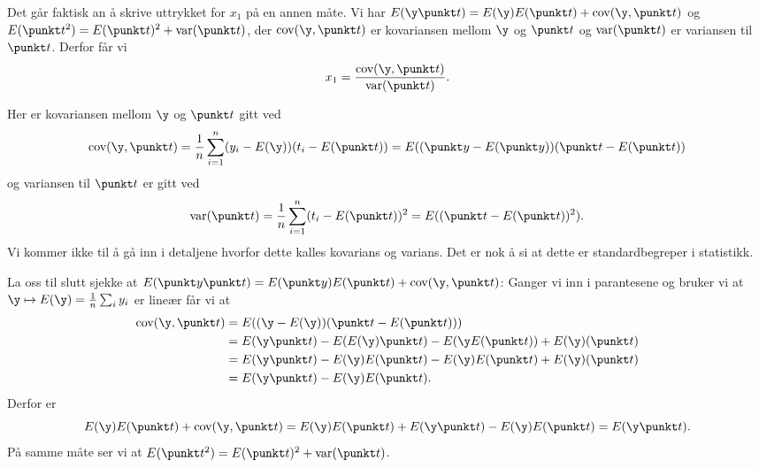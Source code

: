 Det går faktisk an å skrive uttrykket for $x_1$ på en annen måte. Vi har
$E(\y \punkt t) = E(\y)E(\punkt t) + \text{cov}(\y, \punkt t)$ og
$E(\punkt t^2) = E(\punkt t)^2 + \text{var}(\punkt t)$, der $\text{cov}(\y,
\punkt t)$ er kovariansen mellom $\y$ og $\punkt t$ og $\text{var}(\punkt t)$
er variansen til $\punkt t$. Derfor får vi
$$x_1 = \frac{\text{cov}(\y, \punkt t)}{\text{var}(\punkt t)}.$$

Her er kovariansen mellom $\y$ og $\punkt t$ gitt ved
$$\text{cov}(\y, \punkt t) = \frac{1}{n}\sum_{i=1}^n (y_i - E(\y))(t_i - E(\punkt t)) = E((\punkt y - E(\punkt y))(\punkt t - E(\punkt t))$$
og variansen til $\punkt t$ er gitt ved
$$\text{var}(\punkt t) = \frac{1}{n}\sum_{i=1}^n (t_i - E(\punkt t))^2 = E((\punkt t - E(\punkt t))^2).$$
Vi kommer ikke til å gå inn i detaljene hvorfor dette kalles kovarians og
varians. Det er nok å si at dette er standardbegreper i statistikk.

La oss til slutt sjekke at $E(\punkt y \punkt t) = E(\punkt y) E(\punkt t) + \text{cov}(\y, \punkt t)$:
Ganger vi inn i parantesene og bruker vi at $\y \mapsto E(\y) = \frac{1}{n}\sum_i y_i$ er lineær får vi at
\begin{align*}
  \text{cov}(\y, \punkt t) 
  &=
  E((\y - E(\y))(\punkt t - E(\punkt t)))\\
  &= E(\y\punkt t) - E(E(\y)\punkt t) -
  E(\y E(\punkt t)) + E(\y)( \punkt t) \\
  &= E(\y\punkt t) - E(\y)E(\punkt t) -
  E(\y ) E(\punkt t)+ E(\y)( \punkt t) \\
  &= E(\y\punkt t) - E(\y)E(\punkt t) .
\end{align*}
Derfor er
$$
E(\y) E(\punkt t) + \text{cov}(\y, \punkt t) = 
E(\y) E(\punkt t) +
  E(\y\punkt t) - E(\y)E(\punkt t) 
  = E(\y\punkt t).$$
På samme måte ser vi at $E(\punkt t^2) = E(\punkt t)^2 + \text{var}(\punkt t)$.

